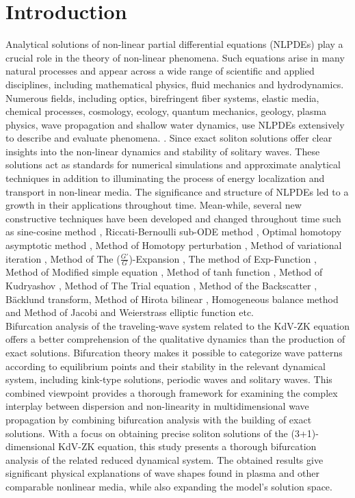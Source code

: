 \documentclass[10pt]{NSP1}
\numberwithin{equation}{section}
\begin{document}
\section{Introduction}
\noindent Analytical solutions of non-linear partial differential equations (NLPDEs) play a crucial role in the theory of non-linear phenomena. Such equations arise in many natural processes and appear across a wide range of scientific and applied disciplines, including mathematical physics, fluid mechanics and hydrodynamics. Numerous fields, including optics, birefringent fiber systems, elastic media, chemical processes, cosmology, ecology, quantum mechanics, geology, plasma physics, wave propagation and shallow water dynamics, use NLPDEs extensively to describe and evaluate phenomena. \cite{b1,b2,b3,b4,b5,b6,b7,b8,b9,b10,b11,b12}. Since exact soliton solutions offer clear insights into the non-linear dynamics and stability of solitary waves. These solutions act as standards for numerical simulations and approximate analytical techniques in addition to illuminating the process of energy localization and transport in non-linear media. The significance and structure of NLPDEs led to a growth in their applications throughout time. Mean-while, several new constructive techniques have been developed and changed throughout time such as sine-cosine method \cite{b13,b14}, Riccati-Bernoulli sub-ODE method \cite{b15}, Optimal homotopy asymptotic method \cite{b16,b17,b18,b19}, Method of Homotopy perturbation \cite{b20}, Method of variational iteration \cite{b21}, Method of The ($\frac{G'}{G}$)-Expansion \cite{b22,b23,b24}, The method of Exp-Function \cite{b25,b26,b27,b28}, Method of Modified simple equation \cite{b29,b30}, Method of tanh function \cite{b31,b32,b33}, Method of Kudryashov \cite{b34,b35}, Method of The Trial equation \cite{b36}, Method of the Backscatter \cite{b37}, B\"{a}cklund transform\cite{b38}, Method of Hirota bilinear \cite{b39}, Homogeneous balance method\cite{b40} and Method of Jacobi and Weierstrass elliptic function \cite{b41} etc.\\
Bifurcation analysis of the traveling-wave system related to the KdV-ZK equation offers a better comprehension of the qualitative dynamics than the production of exact solutions. Bifurcation theory makes it possible to categorize wave patterns according to equilibrium points and their stability in the relevant dynamical system, including kink-type solutions, periodic waves and solitary waves. This combined viewpoint provides a thorough framework for examining the complex interplay between dispersion and non-linearity in multidimensional wave propagation by combining bifurcation analysis with the building of exact solutions. With a focus on obtaining precise soliton solutions of the (3+1)-dimensional KdV-ZK equation, this study presents a thorough bifurcation analysis of the related reduced dynamical system. The obtained results give significant physical explanations of wave shapes found in plasma and other comparable nonlinear media, while also expanding the model's solution space.\\
\end{document}
